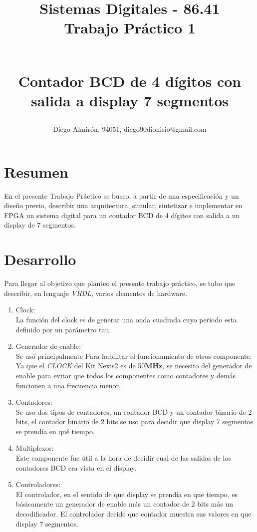 \documentclass[10pt,a4paper]{article}
\author{Diego Almirón, 94051, diego90dionisio@gmail.com}
\title{
\begin{small}
Sistemas Digitales - 86.41 \\
Trabajo Práctico 1
\end{small}
\\ Contador BCD de 4 dígitos con salida a display 7 segmentos
}
\begin{document}
\maketitle
\section*{Resumen}
En el presente Trabajo Práctico se busco, a partir de una especificación y un 
diseño previo, describir una arquitectura, simular, sintetizar e implementar en 
FPGA un sistema digital para un contador BCD de 4 dígitos con salida a un 
display de 7 segmentos. 
\section*{Desarrollo}
Para llegar al objetivo que planteo el presente trabajo práctico, se tubo que 
describir, en lenguaje \textit{VHDL}, varios elementos de hardware.
\begin{enumerate}
\item Clock: \\
La función del clock es de generar una onda cuadrada cuyo periodo esta definido 
por un parámetro tau.
\item Generador de enable: \\
Se usó principalmente Para habilitar el funcionamiento de otros componente. 
Ya que el \textit{CLOCK} del Kit Nexis2 es de 50\textbf{MHz}, se necesito del 
generador de enable para evitar que todos los componentes como contadores y 
demás funcionen a una frecuencia menor. 
\item Contadores: \\
Se uso dos tipos de contadores, un contador BCD y un contador binario de 
2 bits, el contador binario de 2 bits se uso para decidir que display 
7 segmentos se prendía en qué tiempo.
\item Multiplexor: \\
Este componente fue útil a la hora de decidir cual de las salidas de los 
contadores BCD era vista en el display.
\item Controladores: \\
El controlador, en el sentido de que display se prendía en que tiempo, 
es básicamente un generador de enable más un contador de 2 bits más un 
decodificador. El controlador decide que contador muestra sus valores 
en que display 7 segmentos.
\end{enumerate}
\end{document}
